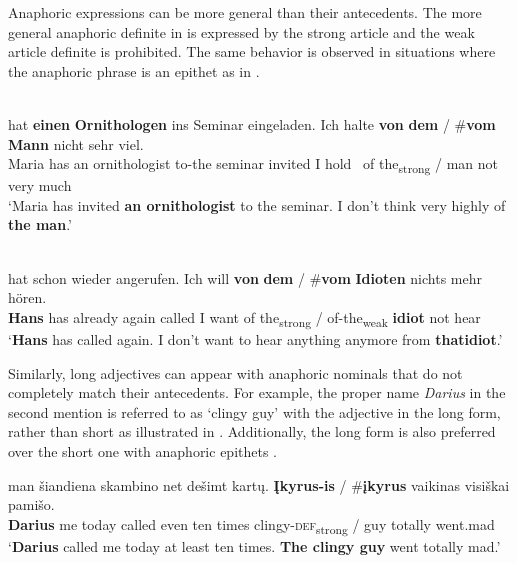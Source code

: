 \documentclass[output=paper,
modfonts
]{langscibook}
\begin{document}
Anaphoric expressions can be more general than their antecedents. The more general anaphoric definite in  is expressed by the strong article  and the weak article definite is prohibited. The same behavior is observed in situations where the anaphoric phrase is an epithet as in .


\begin{exe}
	\ex \label{ex:sereikaite:39}
	 \\
	 {hat} {\textbf{einen}} {\textbf{Ornithologen}} {ins} {Seminar} {eingeladen}. {Ich} {halte} \textbf{von} \textbf{dem} \textnormal{/} \textnormal{\#}\textbf{vom} {\textbf{Mann}} {nicht} {sehr} {viel}. \\
	Maria has {an} {ornithologist} to-the seminar invited I hold \ {of} {the\textsubscript{strong}} /  {man} not very much\\
	\trans `Maria has invited \textbf{an ornithologist} to the seminar. I don't think very highly of \textbf{the man}.' \citep[31]{Schwarz2009}
\end{exe}

\begin{exe}
	\ex \label{ex:sereikaite:40}
	 \\
	 {hat} {schon} {wieder} {angerufen}. {Ich} {will} \textbf{von} \textbf{dem} \textnormal{/} \textnormal{\#}\textbf{vom} \textbf{Idioten} {nichts} {mehr} {hören}.\\
	\textbf{Hans} has already again called I want of {the\textsubscript{strong}} / \phantom{\#}of-the\textsubscript{weak} \textbf{idiot} not hear\\
	\trans `\textbf{Hans} has called again. I don’t want to hear anything anymore from \textbf{that}\largerpage \textbf{idiot}.’  \citep[31]{Schwarz2009}
\end{exe}


Similarly, long adjectives can appear with anaphoric nominals that do not completely match their antecedents. For example, the proper name \textit{Darius} in the second mention is referred to as `clingy guy' with the adjective in the long form, rather than short as illustrated in . Additionally, the long form is also preferred over the short one with anaphoric epithets .

\begin{exe}
	\ex \label{ex:sereikaite:41}
	 {man} {šiandiena} {skambino} {net} {dešimt} {kartų}. \textbf{Įkyrus-is} \textnormal{/} \textnormal{\#}\textbf{įkyrus} {vaikinas} {visiškai} {pamišo}. \\
	\textbf{Darius} me today called even ten times {clingy-\textsc{def}\textsubscript{strong}} /  guy totally went.mad\\
	\trans `\textbf{Darius} called me today at least ten times. \textbf{The clingy guy} went totally mad.' 
\end{exe}
\end{document}
